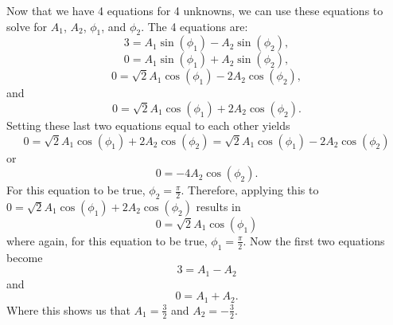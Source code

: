 \documentclass[12pt,letter]{article}
\begin{document}
\begin{example}
\begin{equation}
\end{equation}
Now that we have 4 equations for 4 unknowns, we can use these equations to solve for $A_1$,  $A_2$, $\phi_1$,  and $\phi_2$. The 4 equations are:
\begin{equation}
3= A_1 \sin (\phi_1 ) - A_2 \sin (\phi_2),
\end{equation}
\begin{equation}
0= A_1 \sin (\phi_1 ) + A_2 \sin (\phi_2),
\end{equation}
\begin{equation}
0= \sqrt{2}A_1 \cos (\phi_1 ) - 2A_2 \cos (\phi_2),
\end{equation}
and
\begin{equation}
0= \sqrt{2}A_1 \cos (\phi_1 ) + 2A_2 \cos (\phi_2).
\end{equation}
Setting these last two equations equal to each other yields
\begin{equation}
0= \sqrt{2}A_1 \cos (\phi_1 ) + 2A_2 \cos (\phi_2) = \sqrt{2}A_1 \cos (\phi_1 ) - 2A_2 \cos (\phi_2)
\end{equation}
or
\begin{equation}
0= - 4A_2 \cos (\phi_2).
\end{equation}
For this equation to be true, $\phi_2=\frac{\pi}{2}$. Therefore, applying this to $0= \sqrt{2}A_1 \cos (\phi_1 ) + 2A_2 \cos (\phi_2)$ results in
\begin{equation}
0= \sqrt{2}A_1 \cos (\phi_1 )
\end{equation}
where again, for this equation to be true, $\phi_1=\frac{\pi}{2}$. Now the first two equations become
\begin{equation}
3= A_1 - A_2 
\end{equation}
and
\begin{equation}
0= A_1 + A_2.
\end{equation}
Where this shows us that $A_1 = \frac{3}{2}$ and $A_2 = -\frac{3}{2}$. 


\end{example}
\end{document}
